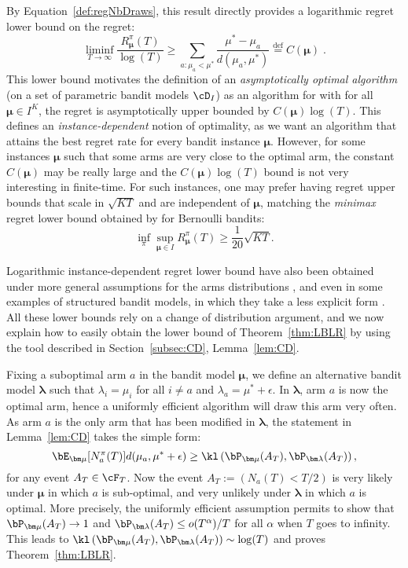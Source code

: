 \documentclass[proc]{edpsmath}
\begin{document}
	By Equation~\eqref{def:regNbDraws}, this result directly provides a logarithmic regret lower bound on the regret: 
	\begin{equation}\label{eq:LBRegret}\liminf_{T\rightarrow \infty}\frac{R^{\pi}_{\bm\mu}(T)}{\log(T)} \geq \sum_{a : \mu_a < \mu^*} \frac{\mu^* - \mu_a}{d(\mu_a,\mu^*)} \stackrel{\mathrm{def}}{=} C(\bm \mu)\;.\end{equation}
	This lower bound motivates the definition of an \emph{asymptotically optimal algorithm} (on a set of parametric bandit models $\cD_I$) as an algorithm for with for all $\bm \mu \in I^K$, the regret is asymptotically upper bounded by  $C(\bm \mu)\log(T)$. This defines an \emph{instance-dependent} notion of optimality, as we want an algorithm that attains the best regret rate for every bandit instance $\bm \mu$. However, for some instances  $\bm\mu$ such that some arms are very close to the optimal arm, the constant $C(\bm \mu)$ may be really large and the $C(\bm \mu)\log(T)$ bound is not very interesting in finite-time. For such instances, one may prefer having regret upper bounds that scale in $\sqrt{KT}$ and are independent of $\bm \mu$, matching the \emph{minimax} regret lower bound obtained by \cite{PLG06,Bubeck:Survey12} for Bernoulli bandits:
	\[\inf_{\pi} \sup_{\bm \mu \in I} R^{\pi}_{\bm \mu}(T) \geq \frac{1}{20}\sqrt{KT}.\]
	
	Logarithmic instance-dependent regret lower bound have also been obtained under more general assumptions for the arms distributions \cite{BurnKat96}, and even in some examples of structured bandit models, in which they take a less explicit form \cite{GravesLai97,Combes14Lip}. All these lower bounds rely on a change of distribution argument, and we now explain how to easily obtain the lower bound of Theorem~\ref{thm:LBLR} by using the tool described in Section~\ref{subsec:CD}, Lemma~\ref{lem:CD}. 
	
	Fixing a suboptimal arm $a$ in the bandit model $\bm \mu$, we define an alternative bandit model $\bm\lambda$ such that $\lambda_i = \mu_i$ for all $i\neq a$ and $\lambda_a = \mu^* + \epsilon$. In $\bm \lambda$, arm $a$ is now the optimal arm, hence a uniformly efficient algorithm will draw this arm very often. As arm $a$ is the only arm that has been modified in $\bm \lambda$, the statement in Lemma~\ref{lem:CD} takes the simple form: 
	\[\bE_{\bm \mu}[N_a^\pi(T)] d(\mu_a,\mu^* + \epsilon) \geq \kl\left(\bP_{\bm \mu}(A_T),\bP_{\bm \lambda}(A_T)\right),\]
	for any event $A_T \in \cF_T$. Now the event $A_T := \left(N_a(T) < T/2\right)$ is very likely under $\bm \mu$ in which $a$ is sub-optimal, and very unlikely under $\bm \lambda$ in which $a$ is optimal. More precisely, the uniformly efficient assumption permits to show that $\bP_{\bm \mu}(A_T) \rightarrow 1$ and $\bP_{\bm \lambda}(A_T) \leq {o(T^\alpha)}/{T}$ for all $\alpha$ when $T$ goes to infinity. This leads to $\kl\left(\bP_{\bm \mu}(A_T),\bP_{\bm \lambda}(A_T)\right) \sim \log(T)$ and proves Theorem~\ref{thm:LBLR}.  
	
\end{document}
